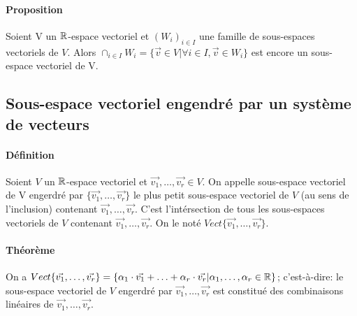 \paragraph{Proposition} Soient V un $\mathbb{R}$-espace vectoriel et $(W_i)_{i \in I}$ une famille de sous-espaces vectoriels de $V$. Alors $\cap_{i \in I} W_i = \{ \vec{v} \in V | \forall i \in I, \vec{v} \in W_i\}$ est encore un sous-espace vectoriel de V.

%
\subsection{Sous-espace vectoriel engendré par un système de vecteurs}
%
\paragraph{Définition} Soient $V$ un $\mathbb{R}$-espace vectoriel et $\vec{v_1}, \ldots, \vec{v_r} \in V$. On appelle sous-espace vectoriel de V engerdré par $\{\vec{v_1}, \ldots, \vec{v_r}\}$ le plus petit sous-espace vectoriel de $V$ (au sens de l'inclusion) contenant $\vec{v_1}, \ldots, \vec{v_r}$. C'est l'intérsection de tous les sous-espaces vectoriels de $V$ contenant $\vec{v_1}, \ldots, \vec{v_r}$. On le noté $Vect\{\vec{v_1}, \ldots, \vec{v_r}\}$.

\paragraph{Théorème} On a $Vect\{\vec{v_1}, \ldots, \vec{v_r}\} = \{\alpha_1 \cdot \vec{v_1} + \ldots + \alpha_r \cdot \vec{v_r} | \alpha_1, \ldots, \alpha_r \in \mathbb{R} \}$; c'est-à-dire: le sous-espace vectoriel de $V$ engerdré par $\vec{v_1}, \ldots, \vec{v_r}$ est constitué des combinaisons linéaires de $\vec{v_1}, \ldots, \vec{v_r}$.

